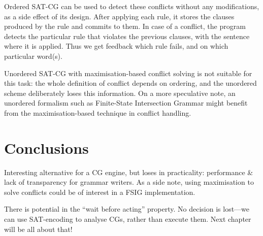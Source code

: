 Ordered SAT-CG can be used to detect these conflicts without any
modifications, as a side effect of its design. 
After applying each rule, it stores the clauses
produced by the rule and commits to them.
In case of a conflict, the program detects the particular rule that 
violates the previous clauses, with the sentence
where it is applied. Thus we get feedback which rule fails, and on which
particular word(s).


Unordered SAT-CG with maximisation-based conflict solving is not
suitable for this task: the whole definition of conflict depends on
ordering, and the unordered scheme deliberately loses this information.
On a more speculative note, an unordered formalism such as Finite-State
Intersection Grammar \cite{koskenniemi90} might benefit from the
maximisation-based technique in conflict handling.



\section{Conclusions}




Interesting alternative for a CG engine, but loses in practicality: performance & lack of transparency for grammar writers.  
As a side note, using maximisation to solve conflicts could be of interest in a FSIG implementation.

There is potential in the ``wait before acting'' property. No decision is lost---we can use SAT-encoding to analyse CGs, rather than execute them. Next chapter will be all about that!



